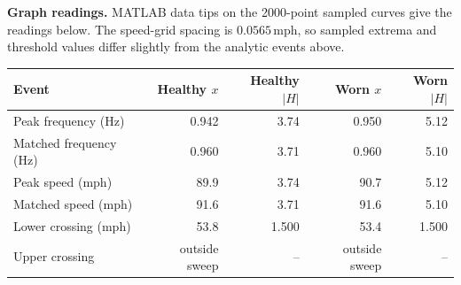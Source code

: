 \noindent\begin{minipage}{\linewidth}\color{black}
\textbf{Graph readings.} MATLAB data tips on the 2000-point sampled curves give the readings below. The speed-grid spacing is $0.0565\,\mathrm{mph}$, so sampled extrema and threshold values differ slightly from the analytic events above.
\begin{center}\small
\begin{tabular}{@{}lrrrr@{}}
\toprule
Event & Healthy $x$ & Healthy $|H|$ & Worn $x$ & Worn $|H|$ \\
\midrule
Peak frequency (Hz) & 0.942 & 3.74 & 0.950 & 5.12 \\
Matched frequency (Hz) & 0.960 & 3.71 & 0.960 & 5.10 \\
Peak speed (mph) & 89.9 & 3.74 & 90.7 & 5.12 \\
Matched speed (mph) & 91.6 & 3.71 & 91.6 & 5.10 \\
Lower crossing (mph) & 53.8 & 1.500 & 53.4 & 1.500 \\
Upper crossing & outside sweep & -- & outside sweep & -- \\
\bottomrule
\end{tabular}
\end{center}
\end{minipage}\par
\clearpage
{}


